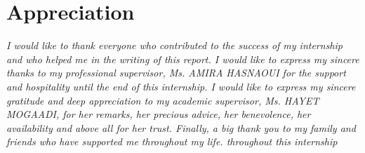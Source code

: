 \chapter*{\huge Appreciation}

\begin{center}
\it \Large
I would like to thank everyone who contributed to the success of my
internship and who helped me in the writing of this report.
I would like to express my sincere thanks to my professional supervisor, Ms.
AMIRA HASNAOUI for the support and hospitality until the
end of this internship.
I would like to express my sincere gratitude and deep appreciation to my
academic supervisor, Ms. HAYET MOGAADI, for her remarks,
her precious advice, her benevolence, her availability and above all for her
trust.
Finally, a big thank you to my family and friends who have supported me throughout my life.
throughout this internship
\end{center}